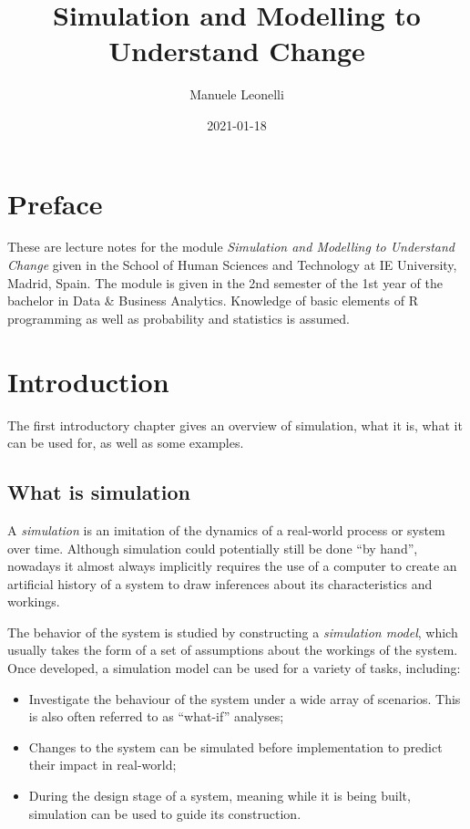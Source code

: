 \documentclass[
]{book}
\title{Simulation and Modelling to Understand Change}
\author{Manuele Leonelli}
\date{2021-01-18}
\begin{document}
\maketitle

{
\setcounter{tocdepth}{1}
\tableofcontents
}
\hypertarget{preface}{%
\chapter*{Preface}\label{preface}}

These are lecture notes for the module \emph{Simulation and Modelling to Understand Change} given in the School of Human Sciences and Technology at IE University, Madrid, Spain. The module is given in the 2nd semester of the 1st year of the bachelor in Data \& Business Analytics. Knowledge of basic elements of R programming as well as probability and statistics is assumed.

\hypertarget{intro}{%
\chapter{Introduction}\label{intro}}

The first introductory chapter gives an overview of simulation, what it is, what it can be used for, as well as some examples.

\hypertarget{what-is-simulation}{%
\section{What is simulation}\label{what-is-simulation}}

A \emph{simulation} is an imitation of the dynamics of a real-world process or system over time. Although simulation could potentially still be done ``by hand'', nowadays it almost always implicitly requires the use of a computer to create an artificial history of a system to draw inferences about its characteristics and workings.

The behavior of the system is studied by constructing a \emph{simulation model}, which usually takes the form of a set of assumptions about the workings of the system. Once developed, a simulation model can be used for a variety of tasks, including:

\begin{itemize}
\item
  Investigate the behaviour of the system under a wide array of scenarios. This is also often referred to as ``what-if'' analyses;
\item
  Changes to the system can be simulated before implementation to predict their impact in real-world;
\item
  During the design stage of a system, meaning while it is being built, simulation can be used to guide its construction.
\end{itemize}
\end{document}
